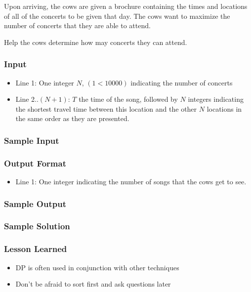 Upon arriving, the cows are given a brochure containing the times and locations of all of the concerts to be given that day.
The cows want to maximize the number of concerts that they are able to attend.

Help the cows determine how may concerts they can attend.

\subsubsection{Input}
\begin{itemize}
	\item Line 1: One integer $N$, $(1<10000)$ indicating the number of concerts
	\item Line 2..$(N+1)$: $T$ the time of the song, followed by $N$ integers indicating the shortest travel time between this location and the other $N$ locations in the same order as they are presented.
\end{itemize}

\subsubsection{Sample Input}


\subsubsection{Output Format}
\begin{itemize}
	\item Line 1: One integer indicating the number of songs that the cows get to see.
\end{itemize}
\subsubsection{Sample Output}


\subsubsection{Sample Solution}


\subsubsection{Lesson Learned}
\begin{itemize}
	\item DP is often used in conjunction with other techniques
	\item Don't be afraid to sort first and ask questions later
\end{itemize}
